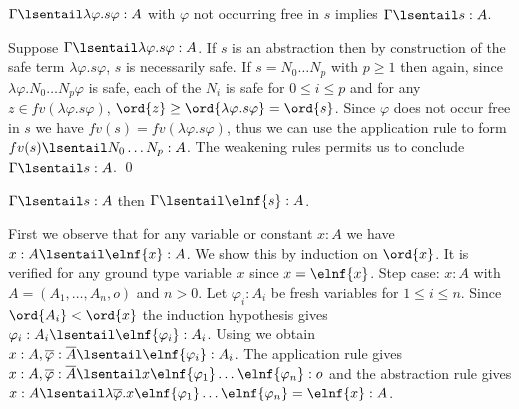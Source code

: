\begin{lemma}
\label{lem:etared_preserve_longsafety}
  $\Gamma \lsentail \lambda \varphi . s \varphi :A $ with $\varphi$ not
  occurring free in $s$ implies $\Gamma \lsentail s :A$.
\end{lemma}
\proof
  Suppose $\Gamma \lsentail \lambda \varphi . s \varphi :A$. If $s$ is an  abstraction then by construction of the safe term $\lambda \varphi . s \varphi$, $s$ is necessarily safe.  If $s = N_0 \ldots N_p$ with
  $p\geq 1$ then again, since $\lambda \varphi . N_0 \ldots N_p
  \varphi$ is safe, each of the $N_i$ is safe for $0 \leq i \leq p$
  and for any $z\in fv(\lambda \varphi . s \varphi)$, $\ord{z} \geq
  \ord{\lambda \varphi . s \varphi} = \ord{s}$. Since  $\varphi$ does not occur free in $s$ we have $fv(s) = fv(\lambda \varphi . s \varphi)$, thus we can use the application rule to form $fv(s) \lsentail N_0 \ldots N_p : A$. The weakening rules permits us to conclude $\Gamma \lsentail s :A$. \qed
\smallskip

\begin{lemma}
\label{lem:longsafe_imp_elnf_longsafe}
$\Gamma \lsentail s :A$ then $\Gamma \lsentail \elnf{s} :A$.
\end{lemma}
\proof
 First we observe that for any variable or constant $x:A$ we have $x:A \lsentail \elnf{x} :A$. We show this by induction on $\ord{x}$.
It is verified for any ground type variable $x$
since $x = \elnf{x}$.
Step case: $x:A$ with $A=(A_1, \ldots, A_n,o)$ and $n>0$. Let $\varphi_i:A_i$ be fresh variables for $1\leq i\leq n$.
Since $\ord{A_i} < \ord{x}$ the induction hypothesis gives $\varphi_i :A_i \lsentail \elnf{\varphi_i} : A_i$. Using  we obtain $x:A, \overline{\varphi} : \overline{A}
  \lsentail \elnf{\varphi_i} :A_i$.  The application rule gives $x :A, \overline{\varphi} : \overline{A} \lsentail x \elnf{\varphi_1} \ldots \elnf{\varphi_n}
  : o$ and the abstraction rule gives $ x :A \lsentail \lambda
  \overline{\varphi} . x \elnf{\varphi_1} \ldots \elnf{\varphi_n} =
  \elnf{x} :A$.


